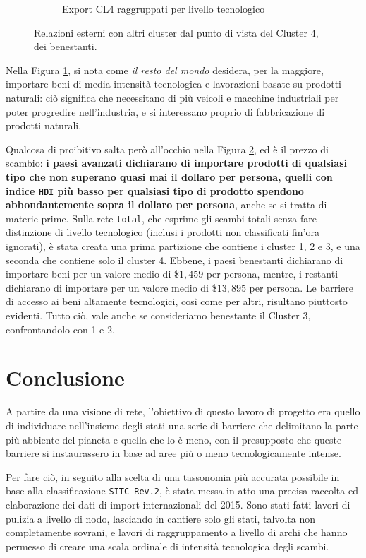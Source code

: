\documentclass[]{article}
\begin{document}
\begin{multicols}{2}
\begin{figure}[th!]
\begin{subfigure}[b]{0.75\textwidth}
			\caption{Export CL4 raggruppati per livello tecnologico}
			\label{fig:export-cl4}
		\end{subfigure}
		\caption{Relazioni esterni con altri cluster dal punto di vista del Cluster 4, dei benestanti.}
		\label{fig:import-export-cl4}
	\end{figure}
	Nella Figura \ref{fig:export-cl4}, si nota come \textit{il resto del mondo} desidera, per la maggiore, importare beni di media intensità tecnologica e lavorazioni basate su prodotti naturali: ciò significa che necessitano di più veicoli e macchine industriali per poter progredire nell'industria, e si interessano proprio di fabbricazione di prodotti naturali.
	
	Qualcosa di proibitivo salta però all'occhio nella Figura \ref{fig:import-export-cl4}, ed è il prezzo di scambio: \textbf{i paesi avanzati dichiarano di importare prodotti di qualsiasi tipo che non superano quasi mai il dollaro per persona, quelli con indice \texttt{HDI} più basso per qualsiasi tipo di prodotto spendono abbondantemente sopra il dollaro per persona}, anche se si tratta di materie prime. Sulla rete \texttt{total}, che esprime gli scambi totali senza fare distinzione di livello tecnologico (inclusi i prodotti non classificati fin'ora ignorati), è stata creata una prima partizione che contiene i cluster 1, 2 e 3, e una seconda che contiene solo il cluster 4. Ebbene, i paesi benestanti dichiarano di importare beni per un valore medio di \$$1,459$ per persona, mentre, i restanti dichiarano di importare per un valore medio di \$$13,895$ per persona. Le barriere di accesso ai beni altamente tecnologici, così come per altri, risultano piuttosto evidenti. Tutto ciò, vale anche se consideriamo benestante il Cluster 3, confrontandolo con 1 e 2.
	
	\section{Conclusione}
	A partire da una visione di rete, l'obiettivo di questo lavoro di progetto era quello di individuare nell'insieme degli stati una serie di barriere che delimitano la parte più abbiente del pianeta e quella che lo è meno, con il presupposto che queste barriere si instaurassero in base ad aree più o meno tecnologicamente intense.
	
	Per fare ciò, in seguito alla scelta di una tassonomia più accurata possibile in base alla classificazione \texttt{SITC Rev.2}, è stata messa in atto una precisa raccolta ed elaborazione dei dati di import internazionali del 2015. Sono stati fatti lavori di pulizia a livello di nodo, lasciando in cantiere solo gli stati, talvolta non completamente sovrani, e lavori di raggruppamento a livello di archi che hanno permesso di creare una scala ordinale di intensità tecnologica degli scambi.
	

\end{multicols}
\end{document}
